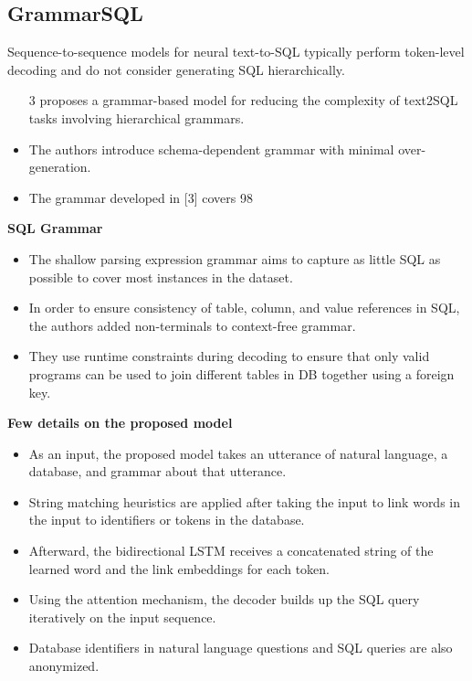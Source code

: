 \subsection*{GrammarSQL}

Sequence-to-sequence models for neural text-to-SQL typically perform token-level decoding and do not consider generating SQL hierarchically.

\begin{itemize}
    \item [3] proposes a grammar-based model for reducing the complexity of text2SQL tasks involving hierarchical grammars.
    \item The authors introduce schema-dependent grammar with minimal over-generation.
    \item The grammar developed in [3] covers 98%
\end{itemize}

\textbf{SQL Grammar}

\begin{itemize}
    \item The shallow parsing expression grammar aims to capture as little SQL as possible to cover most instances in the dataset.
    \item In order to ensure consistency of table, column, and value references in SQL, the authors added non-terminals to context-free grammar.
    \item They use runtime constraints during decoding to ensure that only valid programs can be used to join different tables in DB together using a foreign key.
\end{itemize}

\textbf{Few details on the proposed model}

\begin{itemize}
    \item As an input, the proposed model takes an utterance of natural language, a database, and grammar about that utterance.
    \item String matching heuristics are applied after taking the input to link words in the input to identifiers or tokens in the database.
    \item Afterward, the bidirectional LSTM receives a concatenated string of the learned word and the link embeddings for each token.
    \item Using the attention mechanism, the decoder builds up the SQL query iteratively on the input sequence.
    \item Database identifiers in natural language questions and SQL queries are also anonymized.
\end{itemize}

